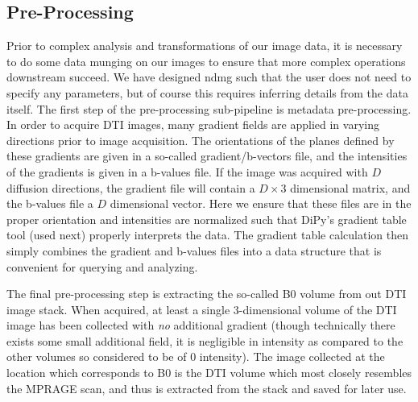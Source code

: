 \subsection{Pre-Processing}
\label{sec:preproc}
Prior to complex analysis and transformations of our image data, it is necessary to do some data munging on our images to ensure that more complex operations downstream succeed. We have designed ndmg such that the user does not need to specify any parameters, but of course this requires inferring details from the data itself. The first step of the pre-processing sub-pipeline is metadata pre-processing. In order to acquire DTI images, many gradient fields are applied in varying directions prior to image acquisition. The orientations of the planes defined by these gradients are given in a so-called gradient/b-vectors file, and the intensities of the gradients is given in a b-values file. If the image was acquired with $D$ diffusion directions, the gradient file will contain a $D \times 3$ dimensional matrix, and the b-values file a $D$ dimensional vector. Here we ensure that these files are in the proper orientation and intensities are normalized such that DiPy's gradient table tool (used next) properly interprets the data. The gradient table calculation then simply combines the gradient and b-values files into a data structure that is convenient for querying and analyzing.

The final pre-processing step is extracting the so-called B0 volume from out DTI image stack. When acquired, at least a single 3-dimensional volume of the DTI image has been collected with \textit{no} additional gradient (though technically there exists some small additional field, it is negligible in intensity as compared to the other volumes so considered to be of 0 intensity). The image collected at the location which corresponds to B0 is the DTI volume which most closely resembles the MPRAGE scan, and thus is extracted from the stack and saved for later use.

